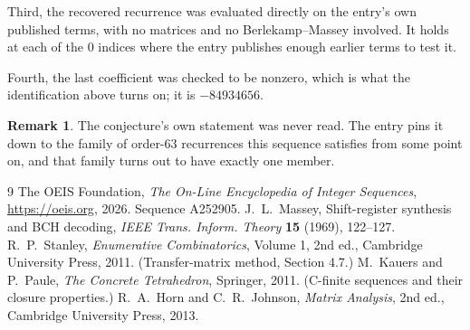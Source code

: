 \documentclass[11pt,a4paper]{article}
\theoremstyle{plain}
\theoremstyle{definition}
\newtheorem{remark}[theorem]{Remark}
\begin{document}
Third, the recovered recurrence was evaluated directly on the entry's own published terms, with
no matrices and no Berlekamp--Massey involved. It holds at each of the $0$ indices where
the entry publishes enough earlier terms to test it.

Fourth, the last coefficient was checked to be nonzero, which is what the identification above
turns on; it is $-84934656$.

\begin{remark}
The conjecture's own statement was never read. The entry pins it down to the family of
order-$63$ recurrences this sequence satisfies from some point on, and that family turns
out to have exactly one member.
\end{remark}

\begin{thebibliography}{9}
 The OEIS Foundation, \emph{The On-Line Encyclopedia of Integer
Sequences}, \url{https://oeis.org}, 2026. Sequence A252905.
 J.~L.~Massey, Shift-register synthesis and BCH decoding, \emph{IEEE
Trans. Inform. Theory} \textbf{15} (1969), 122--127.
 R.~P.~Stanley, \emph{Enumerative Combinatorics}, Volume 1, 2nd ed.,
Cambridge University Press, 2011. (Transfer-matrix method, Section 4.7.)
 M.~Kauers and P.~Paule, \emph{The Concrete Tetrahedron}, Springer, 2011.
(C-finite sequences and their closure properties.)
 R.~A.~Horn and C.~R.~Johnson, \emph{Matrix Analysis}, 2nd ed., Cambridge
University Press, 2013.
\end{thebibliography}
\end{document}

